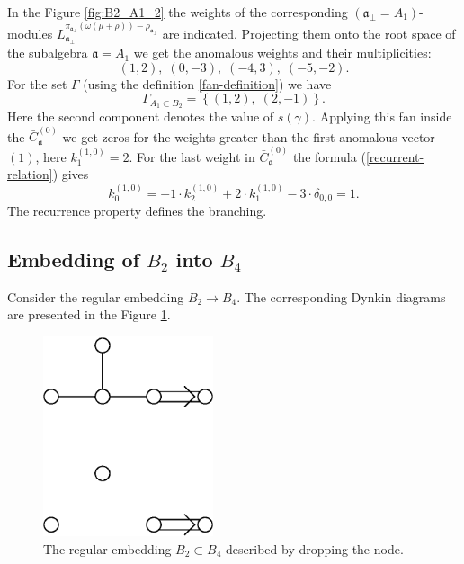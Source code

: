 \documentclass[12pt]{iopart}
\theoremstyle{definition}
\theoremstyle{definition}
\theoremstyle{definition}
\theoremstyle{definition}
\begin{document}
In the Figure \ref{fig:B2_A1_2} the weights of the corresponding
$\left(\mathfrak{a}_{\bot}=A_1\right)$-modules
$L^{\pi_{\mathfrak{a}_{\bot}}(\omega(\mu+\rho))-\rho_{\mathfrak{a}_{\bot}}}_{\mathfrak{a}_{\bot}}$
are indicated. Projecting them onto the root space of the subalgebra $\mathfrak{a}=A_1$
we get the anomalous weights and their multiplicities:
\begin{equation*}
  \label{eq:25}
  (1,2),\; (0,-3),\; (-4,3),\; (-5,-2).
\end{equation*}
For the set $\Gamma$ (using the definition \ref{fan-definition}) we have
\begin{equation*}
  \label{eq:22}
  \Gamma_{A_1\subset B_2}=\left\{ (1,2),\; (2,-1) \right\}.
\end{equation*}
Here the second component denotes the value of $s(\gamma)$.
Applying this fan inside the $\bar{C}^{(0)}_{\mathfrak{a}}$ we get zeros for the weights
greater than the first anomalous vector $(1)$, here $k^{(1,0)}_1=2$. For the last weight in $\bar{C}^{(0)}_{\mathfrak{a}}$ the formula (\ref{recurrent-relation}) gives
\begin{equation*}
  \label{eq:23}
  k^{(1,0)}_{0}=-1\cdot k^{(1,0)}_2 +2\cdot k^{(1,0)}_1 - 3\cdot \delta_{0,0} = 1.
\end{equation*}
The recurrence property defines the branching.

\subsection{Embedding of $B_2$ into $B_4$}
\label{sec:someth-high-dimens}
Consider the regular embedding $B_2 \longrightarrow B_4$.
The corresponding Dynkin diagrams are presented in the Figure \ref{fig:dynkin}.
\begin{figure}[h]
  \centering
  \includegraphics[width=50mm]{figure3.eps}
  \caption{The regular embedding $B_2\subset B_4$ described by dropping the node.}
  \label{fig:dynkin}
\end{figure}
\end{document}
